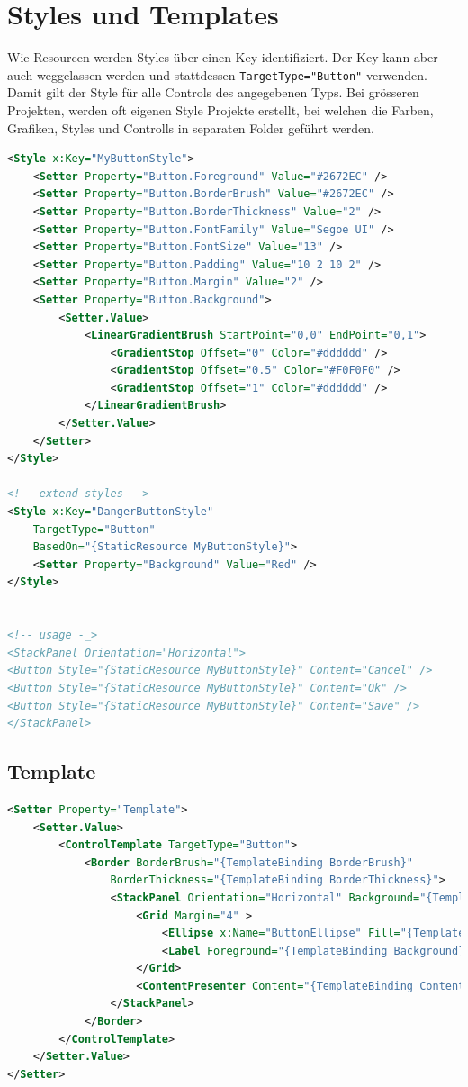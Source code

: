 \section{Styles und Templates}
Wie Resourcen werden Styles über einen Key identifiziert. Der Key kann aber auch weggelassen werden und stattdessen \lstinline|TargetType="Button"| verwenden. Damit gilt der Style für alle Controls des angegebenen Typs. Bei grösseren Projekten, werden oft eigenen Style Projekte erstellt, bei welchen die Farben, Grafiken, Styles und Controlls in separaten Folder geführt werden.
\begin{lstlisting}[caption=Styles, language=XML]
<Style x:Key="MyButtonStyle">
	<Setter Property="Button.Foreground" Value="#2672EC" />
	<Setter Property="Button.BorderBrush" Value="#2672EC" />
	<Setter Property="Button.BorderThickness" Value="2" />
	<Setter Property="Button.FontFamily" Value="Segoe UI" />
	<Setter Property="Button.FontSize" Value="13" />
	<Setter Property="Button.Padding" Value="10 2 10 2" />
	<Setter Property="Button.Margin" Value="2" />
	<Setter Property="Button.Background">
		<Setter.Value>
			<LinearGradientBrush StartPoint="0,0" EndPoint="0,1">
				<GradientStop Offset="0" Color="#dddddd" />
				<GradientStop Offset="0.5" Color="#F0F0F0" />
				<GradientStop Offset="1" Color="#dddddd" />
			</LinearGradientBrush>
		</Setter.Value>
	</Setter>
</Style>

<!-- extend styles -->
<Style x:Key="DangerButtonStyle" 
	TargetType="Button"
	BasedOn="{StaticResource MyButtonStyle}">
	<Setter Property="Background" Value="Red" />
</Style>


<!-- usage -_>
<StackPanel Orientation="Horizontal">
<Button Style="{StaticResource MyButtonStyle}" Content="Cancel" />
<Button Style="{StaticResource MyButtonStyle}" Content="Ok" />
<Button Style="{StaticResource MyButtonStyle}" Content="Save" />
</StackPanel>
\end{lstlisting}

\subsection{Template}
\begin{lstlisting}[caption=Eigene Resource Dictionaries, language=XML]
<Setter Property="Template">
	<Setter.Value>
		<ControlTemplate TargetType="Button">
			<Border BorderBrush="{TemplateBinding BorderBrush}"
				BorderThickness="{TemplateBinding BorderThickness}">
				<StackPanel Orientation="Horizontal" Background="{TemplateBinding Background}">
					<Grid Margin="4" >
						<Ellipse x:Name="ButtonEllipse" Fill="{TemplateBinding Foreground}" Height="16" Width="16" />
						<Label Foreground="{TemplateBinding Background}" HorizontalContentAlignment="Center">!</Label>
					</Grid>
					<ContentPresenter Content="{TemplateBinding Content}" Margin="0 0 10 0" VerticalAlignment="Center" />
				</StackPanel>
			</Border>
		</ControlTemplate>
	</Setter.Value>
</Setter>
\end{lstlisting}


